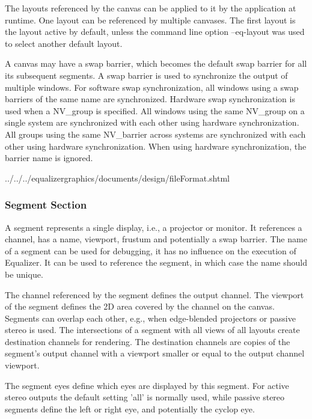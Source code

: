 \documentclass[10pt,a4]{scrartcl}
\begin{document}
The layouts referenced by the canvas can be applied to it by the application at
runtime. One layout can be referenced by multiple canvases. The first layout is
the layout active by default, unless the command line option
\textsf{--eq-layout} was used to select another default layout.

A canvas may have a swap barrier, which becomes the default swap barrier for all
its subsequent segments. A swap barrier is used to synchronize the output of
multiple windows. For software swap synchronization, all windows using a swap
barriers of the same name are synchronized. Hardware swap synchronization is
used when a \textsf{NV\_group} is specified. All windows using the same
\textsf{NV\_group} on a single system are synchronized with each other using
hardware synchronization. All groups using the same \textsf{NV\_barrier} across
systems are synchronized with each other using hardware synchronization. When
using hardware synchronization, the barrier name is ignored.

{\footnotesize
  {../../../equalizergraphics/documents/design/fileFormat.shtml}}

\subsubsection{Segment Section}

A segment represents a single display, i.e., a projector or monitor. It
references a channel, has a name, viewport, frustum and potentially a swap
barrier. The name of a segment can be used for debugging, it has no influence on
the execution of Equalizer. It can be used to reference the segment, in which
case the name should be unique.

The channel referenced by the segment defines the output channel. The viewport
of the segment defines the 2D area covered by the channel on the
canvas. Segments can overlap each other, e.g., when edge-blended projectors or
passive stereo is used. The intersections of a segment with all views of all
layouts create destination channels for rendering. The destination channels are
copies of the segment's output channel with a viewport smaller or equal to the
output channel viewport.

The segment eyes define which eyes are displayed by this segment. For active
stereo outputs the default setting 'all' is normally used, while passive stereo
segments define the left or right eye, and potentially the cyclop eye.
\end{document}
